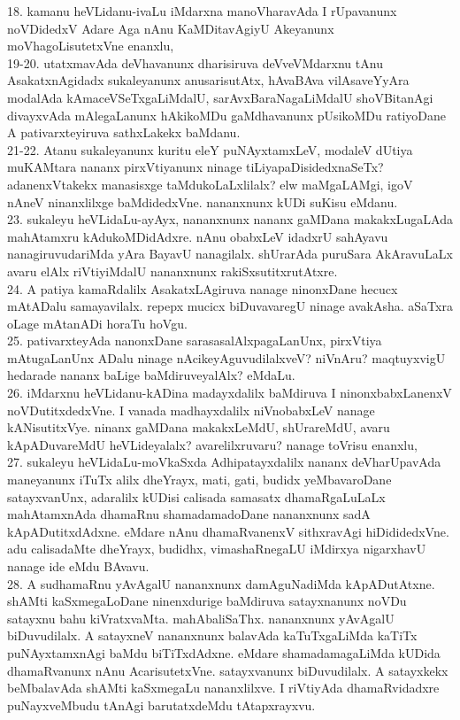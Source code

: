 \documentclass{article}
\begin{document}
18. kamanu heVLidanu-ivaLu iMdarxna manoVharavAda I rUpavanunx noVDidedxV Adare Aga nAnu KaMDitavAgiyU Akeyanunx moVhagoLisutetxVne enanxlu,\\
19-20. utatxmavAda deVhavanunx dharisiruva deVveVMdarxnu tAnu AsakatxnAgidadx sukaleyanunx anusarisutAtx, hAvaBAva vilAsaveYyAra modalAda kAmaceVSeTxgaLiMdalU, sarAvxBaraNagaLiMdalU shoVBitanAgi divayxvAda mAlegaLanunx hAkikoMDu gaMdhavanunx pUsikoMDu ratiyoDane A pativarxteyiruva sathxLakekx baMdanu.\\
21-22. Atanu sukaleyanunx kuritu eleY puNAyxtamxLeV, modaleV dUtiya muKAMtara nananx pirxVtiyanunx ninage tiLiyapaDisidedxnaSeTx? adanenxVtakekx manasisxge taMdukoLaLxlilalx? elw maMgaLAMgi, igoV nAneV ninanxlilxge baMdidedxVne. nananxnunx kUDi suKisu eMdanu.\\
23. sukaleyu heVLidaLu-ayAyx, nananxnunx nananx gaMDana makakxLugaLAda mahAtamxru kAdukoMDidAdxre. nAnu obabxLeV idadxrU sahAyavu nanagiruvudariMda yAra BayavU nanagilalx. shUrarAda puruSara AkAravuLaLx avaru elAlx riVtiyiMdalU nananxnunx rakiSxsutitxrutAtxre.\\
24. A patiya kamaRdalilx AsakatxLAgiruva nanage ninonxDane hecucx mAtADalu samayavilalx. repepx mucicx biDuvavaregU ninage avakAsha. aSaTxra oLage mAtanADi horaTu hoVgu.\\
25. pativarxteyAda nanonxDane sarasasalAlxpagaLanUnx, pirxVtiya mAtugaLanUnx ADalu ninage nAcikeyAguvudilalxveV? niVnAru? maqtuyxvigU hedarade nananx baLige baMdiruveyalAlx? eMdaLu.\\
26. iMdarxnu heVLidanu-kADina madayxdalilx baMdiruva I ninonxbabxLanenxV noVDutitxdedxVne. I vanada madhayxdalilx niVnobabxLeV nanage kANisutitxVye. ninanx gaMDana makakxLeMdU, shUrareMdU, avaru kApADuvareMdU heVLideyalalx? avarelilxruvaru? nanage toVrisu enanxlu,\\
27. sukaleyu heVLidaLu-moVkaSxda Adhipatayxdalilx nananx deVharUpavAda maneyanunx iTuTx alilx dheYrayx, mati, gati, budidx yeMbavaroDane satayxvanUnx, adaralilx kUDisi calisada samasatx dhamaRgaLuLaLx mahAtamxnAda dhamaRnu shamadamadoDane nananxnunx sadA kApADutitxdAdxne. eMdare nAnu dhamaRvanenxV sithxravAgi hiDididedxVne. adu calisadaMte dheYrayx, budidhx, vimashaRnegaLU iMdirxya nigarxhavU nanage ide eMdu BAvavu.\\
28. A sudhamaRnu yAvAgalU nananxnunx damAguNadiMda kApADutAtxne. shAMti kaSxmegaLoDane ninenxdurige baMdiruva satayxnanunx noVDu satayxnu bahu kiVratxvaMta. mahAbaliSaThx. nananxnunx yAvAgalU biDuvudilalx. A satayxneV nananxnunx balavAda kaTuTxgaLiMda kaTiTx puNAyxtamxnAgi baMdu biTiTxdAdxne. eMdare shamadamagaLiMda kUDida dhamaRvanunx nAnu AcarisutetxVne. satayxvanunx biDuvudilalx. A satayxkekx beMbalavAda shAMti kaSxmegaLu nananxlilxve. I riVtiyAda dhamaRvidadxre puNayxveMbudu tAnAgi barutatxdeMdu tAtapxrayxvu.\\
\end{document}
